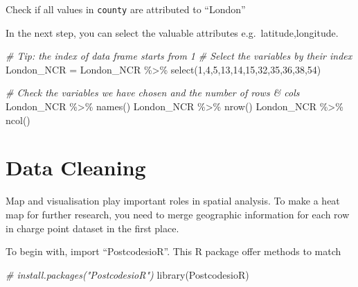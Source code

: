 \documentclass[
]{book}
\newenvironment{Shaded}{\begin{snugshade}}{\end{snugshade}}
\newcommand{\CommentTok}[1]{\textcolor[rgb]{0.56,0.35,0.01}{\textit{#1}}}
\newcommand{\DecValTok}[1]{\textcolor[rgb]{0.00,0.00,0.81}{#1}}
\newcommand{\FunctionTok}[1]{\textcolor[rgb]{0.00,0.00,0.00}{#1}}
\newcommand{\NormalTok}[1]{#1}
\newcommand{\OtherTok}[1]{\textcolor[rgb]{0.56,0.35,0.01}{#1}}
\newcommand{\SpecialCharTok}[1]{\textcolor[rgb]{0.00,0.00,0.00}{#1}}
\begin{document}
Check if all values in \texttt{county} are attributed to ``London''

\begin{Shaded}
\end{Shaded}

In the next step, you can select the valuable attributes e.g.~latitude,longitude.

\begin{Shaded}
\begin{Highlighting}[]
\CommentTok{\# Tip: the index of data frame starts from 1}
\CommentTok{\# Select the variables by their index}
\NormalTok{London\_NCR }\OtherTok{=}\NormalTok{ London\_NCR }\SpecialCharTok{\%\textgreater{}\%}
  \FunctionTok{select}\NormalTok{(}\DecValTok{1}\NormalTok{,}\DecValTok{4}\NormalTok{,}\DecValTok{5}\NormalTok{,}\DecValTok{13}\NormalTok{,}\DecValTok{14}\NormalTok{,}\DecValTok{15}\NormalTok{,}\DecValTok{32}\NormalTok{,}\DecValTok{35}\NormalTok{,}\DecValTok{36}\NormalTok{,}\DecValTok{38}\NormalTok{,}\DecValTok{54}\NormalTok{)}

\CommentTok{\# Check the variables we have chosen and the number of rows \& cols}
\NormalTok{London\_NCR }\SpecialCharTok{\%\textgreater{}\%}
  \FunctionTok{names}\NormalTok{()}
\NormalTok{London\_NCR }\SpecialCharTok{\%\textgreater{}\%}
  \FunctionTok{nrow}\NormalTok{()}
\NormalTok{London\_NCR }\SpecialCharTok{\%\textgreater{}\%}
  \FunctionTok{ncol}\NormalTok{()}
\end{Highlighting}
\end{Shaded}

\hypertarget{data-cleaning}{%
\section{Data Cleaning}\label{data-cleaning}}

Map and visualisation play important roles in spatial analysis. To make a heat map for further research, you need to merge geographic information for each row in charge point dataset in the first place.

To begin with, import ``PostcodesioR''. This R package offer methods to match

\begin{Shaded}
\begin{Highlighting}[]
\CommentTok{\# install.packages("PostcodesioR")}
\FunctionTok{library}\NormalTok{(PostcodesioR)}
\end{Highlighting}
\end{Shaded}
\end{document}
